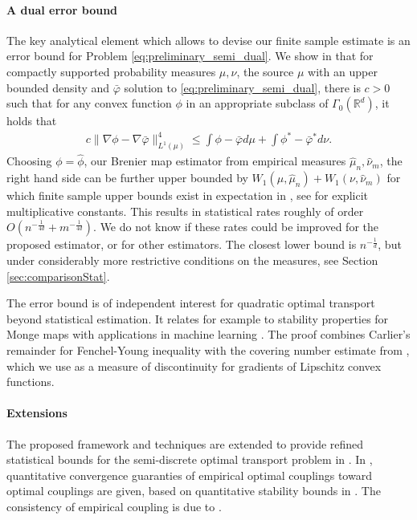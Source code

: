 \documentclass[11pt]{article}
\newcommand{\RR}{\mathbb{R}}
\newcommand{\1}{\mathbbm{1}}
\numberwithin{equation}{section}
\begin{document}
\paragraph{A dual error bound} The key analytical element which allows to devise our finite sample estimate is an error bound for Problem \eqref{eq:preliminary_semi_dual}. We show in  that for compactly supported probability measures $\mu,\nu$, the source $\mu$ with an upper bounded density and $\bar{\varphi}$ solution to \eqref{eq:preliminary_semi_dual}, there is $c>0$ such that for any convex function $\phi$ in an appropriate subclass of $\Gamma_0(\RR^d)$, it holds that
\begin{align}
    c\|\nabla \phi - \nabla \bar{\varphi}\|_{L^1(\mu)}^4 \leq  \int \phi - \bar\varphi d\mu + \int \phi^* - \bar\varphi^* d\nu.
    \label{eq:prelimErrorBound}
\end{align}
Choosing $\phi = \hat{\phi}$,  our Brenier map estimator from empirical measures $\hat{\mu}_n,\hat{\nu}_m$, the right hand side can be further upper bounded by $W_1(\mu,\hat{\mu}_n) + W_1(\nu,\hat{\nu}_m)$ for which finite sample upper bounds exist in expectation in \cite{fournier2015rate}, see \cite{fournier2023convergence} for explicit multiplicative constants. This results in statistical rates roughly of order $O(n^{-\frac{1}{4d}} + m^{-\frac{1}{4d}})$. We do not know if these rates could be improved for the proposed estimator, or for other estimators. The closest lower bound is $n^{-\frac{1}{d}}$, but under  considerably more restrictive conditions on the measures, see Section \ref{sec:comparisonStat}.

The error bound is of independent interest for quadratic optimal transport beyond statistical estimation. It relates for example to stability properties for Monge maps \cite{gigli2011holder} with applications in machine learning \cite{merigot2020quantitative}. The proof combines Carlier's remainder for Fenchel-Young inequality \cite{carlier2023fenchel} with the covering number estimate from \cite{carlier2025quantitative}, which we use as a measure of discontinuity for gradients of Lipschitz convex functions. 

\paragraph{Extensions} The proposed framework and techniques are extended to provide refined statistical bounds for the semi-discrete optimal transport problem in . In , quantitative convergence guaranties of empirical optimal couplings toward optimal couplings are given, based on quantitative stability bounds in . The consistency of empirical coupling is due to \cite{segers2022graphical}.
\end{document}
